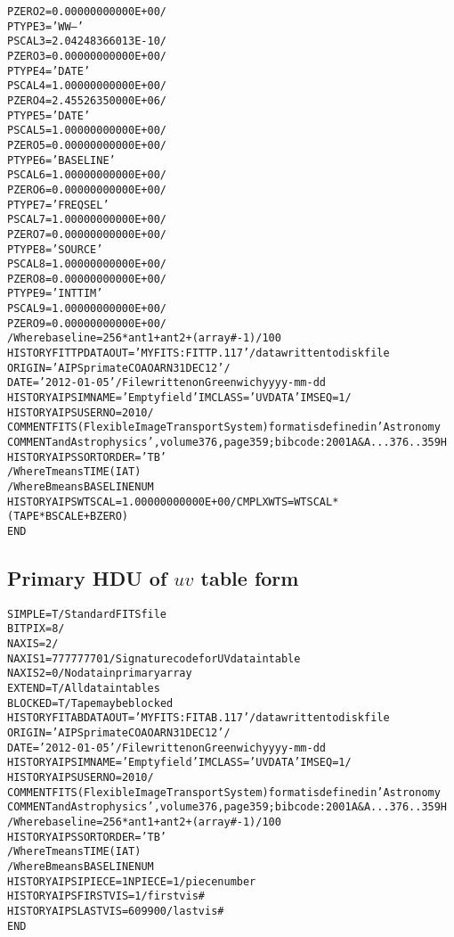 \documentclass[twoside]{article}
\begin{document}
\begin{alltt}
PZERO2  =    0.00000000000E+00 /
PTYPE3  = 'WW--    '
PSCAL3  =    2.04248366013E-10 /
PZERO3  =    0.00000000000E+00 /
PTYPE4  = 'DATE    '
PSCAL4  =    1.00000000000E+00 /
PZERO4  =    2.45526350000E+06 /
PTYPE5  = 'DATE    '
PSCAL5  =    1.00000000000E+00 /
PZERO5  =    0.00000000000E+00 /
PTYPE6  = 'BASELINE'
PSCAL6  =    1.00000000000E+00 /
PZERO6  =    0.00000000000E+00 /
PTYPE7  = 'FREQSEL '
PSCAL7  =    1.00000000000E+00 /
PZERO7  =    0.00000000000E+00 /
PTYPE8  = 'SOURCE  '
PSCAL8  =    1.00000000000E+00 /
PZERO8  =    0.00000000000E+00 /
PTYPE9  = 'INTTIM  '
PSCAL9  =    1.00000000000E+00 /
PZERO9  =    0.00000000000E+00 /
         / Where baseline = 256*ant1 + ant2 + (array#-1)/100
HISTORY FITTP DATAOUT = 'MYFITS:FITTP.117' / data written to disk file
ORIGIN  = 'AIPSprimate      COAOARN              31DEC12'    /
DATE    = '2012-01-05'   / File written on Greenwich yyyy-mm-dd
HISTORY AIPS   IMNAME='Empty field ' IMCLASS='UVDATA' IMSEQ=   1     /
HISTORY AIPS   USERNO= 2010            /
COMMENT   FITS (Flexible Image Transport System) format is defined in 'Astronomy
COMMENT   and Astrophysics', volume 376, page 359; bibcode: 2001A&A...376..359H
HISTORY AIPS   SORT ORDER = 'TB'
              / Where T means TIME (IAT)
              / Where B means BASELINE NUM
HISTORY AIPS WTSCAL =  1.00000000000E+00 / CMPLX WTS=WTSCAL*(TAPE*BSCALE+BZERO)
END
\end{alltt}
\vfill\eject

\subsection{Primary HDU of $uv$ table form}
\label{Appe:HDUtable}
\small
\begin{alltt}
SIMPLE  =                    T / Standard FITS file
BITPIX  =                    8 /
NAXIS   =                    2 /
NAXIS1  =            777777701 / Signature code for UV data in table
NAXIS2  =                    0 / No data in primary array
EXTEND  =                    T / All data in tables
BLOCKED =                    T / Tape may be blocked
HISTORY FITAB DATAOUT = 'MYFITS:FITAB.117' / data written to disk file
ORIGIN  = 'AIPSprimate      COAOARN              31DEC12'    /
DATE    = '2012-01-05'   / File written on Greenwich yyyy-mm-dd
HISTORY AIPS   IMNAME='Empty field ' IMCLASS='UVDATA' IMSEQ=   1     /
HISTORY AIPS   USERNO= 2010            /
COMMENT   FITS (Flexible Image Transport System) format is defined in 'Astronomy
COMMENT   and Astrophysics', volume 376, page 359; bibcode: 2001A&A...376..359H
         / Where baseline = 256*ant1 + ant2 + (array#-1)/100
HISTORY AIPS   SORT ORDER = 'TB'
              / Where T means TIME (IAT)
              / Where B means BASELINE NUM
HISTORY AIPS   IPIECE= 1 NPIECE= 1     / piece number
HISTORY AIPS   FIRSTVIS=           1     / first vis #
HISTORY AIPS   LASTVIS =      609900     / last vis #
END
\end{alltt}
\end{document}
